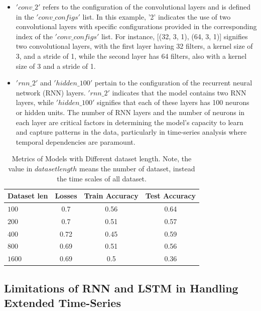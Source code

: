 \documentclass[10pt,twocolumn,letterpaper]{article}
\begin{document}
\begin{itemize}
   \item \textbf{$'conv\_2'$} refers to the configuration of the convolutional layers and is defined in the $'conv\_configs'$ list. In this example, '2' indicates the use of two convolutional layers with specific configurations provided in the corresponding index of the $'conv\_configs'$ list. For instance, [(32, 3, 1), (64, 3, 1)] signifies two convolutional layers, with the first layer having 32 filters, a kernel size of 3, and a stride of 1, while the second layer has 64 filters, also with a kernel size of 3 and a stride of 1.

   \item \textbf{$'rnn\_2'$} and $'hidden\_100'$ pertain to the configuration of the recurrent neural network (RNN) layers. $'rnn\_2'$ indicates that the model contains two RNN layers, while $'hidden\_100'$ signifies that each of these layers has 100 neurons or hidden units. The number of RNN layers and the number of neurons in each layer are critical factors in determining the model's capacity to learn and capture patterns in the data, particularly in time-series analysis where temporal dependencies are paramount.
\end{itemize}

\begin{table}
   \footnotesize
   \centering
   \begin{tabular}{lccc}
      \hline
      Dataset len & Losses & Train Accuracy & Test Accuracy \\ \hline
      $100$       & 0.7    & 0.56           & 0.64          \\
      $200$       & 0.7    & 0.51           & 0.57          \\
      $400$       & 0.72   & 0.45           & 0.59          \\
      $800$       & 0.69   & 0.51           & 0.56          \\
      $1600$      & 0.69   & 0.5            & 0.36          \\
   \end{tabular}
   \caption{Metrics of Models with Different dataset length. Note, the value in $dataset length$ means the number of dataset, instead the time scales of all dataset.}
   \label{tab:performance_metrics_transposed}
\end{table}

\subsection{Limitations of RNN and LSTM in Handling Extended Time-Series}
\end{document}
